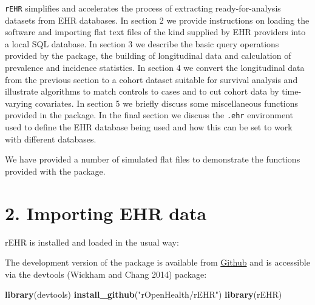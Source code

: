 \documentclass[]{article}
\newenvironment{Shaded}{\begin{snugshade}}{\end{snugshade}}
\newcommand{\KeywordTok}[1]{\textcolor[rgb]{0.13,0.29,0.53}{\textbf{{#1}}}}
\newcommand{\StringTok}[1]{\textcolor[rgb]{0.31,0.60,0.02}{{#1}}}
\newcommand{\NormalTok}[1]{{#1}}
\begin{document}
\texttt{rEHR} simplifies and accelerates the process of extracting
ready-for-analysis datasets from EHR databases. In section 2 we provide
instructions on loading the software and importing flat text files of
the kind supplied by EHR providers into a local SQL database. In section
3 we describe the basic query operations provided by the package, the
building of longitudinal data and calculation of prevalence and
incidence statistics. In section 4 we convert the longitudinal data from
the previous section to a cohort dataset suitable for survival analysis
and illustrate algorithms to match controls to cases and to cut cohort
data by time-varying covariates. In section 5 we briefly discuss some
miscellaneous functions provided in the package. In the final section we
discuss the \texttt{.ehr} environment used to define the EHR database
being used and how this can be set to work with different databases.

We have provided a number of simulated flat files to demonstrate the
functions provided with the package.

\section{2. Importing EHR data}\label{importing-ehr-data}

rEHR is installed and loaded in the usual way:

\begin{Shaded}
\end{Shaded}

The development version of the package is available from
\href{http://www.github.com}{Github} and is accessible via the devtools
(Wickham and Chang 2014) package:

\begin{Shaded}
\begin{Highlighting}[]
\KeywordTok{library}\NormalTok{(devtools)}
\KeywordTok{install_github}\NormalTok{(}\StringTok{"rOpenHealth/rEHR"}\NormalTok{)}
\KeywordTok{library}\NormalTok{(rEHR)}
\end{Highlighting}
\end{Shaded}
\end{document}
